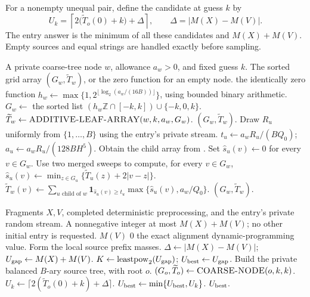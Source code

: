 \documentclass[11pt]{article}
\newenvironment{wedalgorithm}[2]{%
  \begin{algorithm}[!htbp]%
  \caption{#1}\label{#2}%
  \small\begin{algorithmic}[1]%
}{%
  \end{algorithmic}\end{algorithm}%
}
\theoremstyle{definition}
\newcommand{\1}{\mathbf 1}
\begin{document}
For a nonempty unequal pair, define the candidate at guess $k$ by
\[
 U_k=\left\lceil2\bigl(\widetilde T_o(0)+k\bigr)+\Delta\right\rceil,
 \qquad \Delta=|M(X)-M(V)|.
\]
The entry answer is the minimum of all these candidates and
$M(X)+M(V)$. Empty sources and equal strings are handled exactly before
sampling.

\begin{wedalgorithm}{Adaptive coarse-node arrays}{alg:coarse-node}
\Require A private coarse-tree node $w$, allowance $a_w>0$, and fixed guess $k$.
\Ensure The sorted grid array $(G_w,\widetilde T_w)$, or the zero function for an empty node.
   \State \Return the identically zero function \EndIf
  \State $h_w\gets\max\{1,2^{\lfloor\log_2(a_w/(16B))\rfloor}\}$, using bounded binary arithmetic.
  \State $G_w\gets$ the sorted list $(h_w\mathbb Z\cap[-k,k])\cup\{-k,0,k\}$.
    \State $\widetilde T_w\gets\Call{ADDITIVE-LEAF-ARRAY}{w,k,a_w,G_w}$.
    \State \Return $(G_w,\widetilde T_w)$.
  \EndIf
    \State Draw $R_u$ uniformly from $\{1,\ldots,B\}$ using the entry's private stream.
    \State $t_u\gets a_wR_u/(BQ_0)$; $a_u\gets a_wR_u/(128BH^5)$.
    \State Obtain the child array from .
  \EndFor
      \State Set $\widehat s_u(v)\gets0$ for every $v\in G_w$.
    \Else
      \State Use two merged sweeps to compute, for every $v\in G_w$,
      \Statex \hspace{\algorithmicindent}$\widehat s_u(v)\gets\min_{z\in G_u}\{\widetilde T_u(z)+2|v-z|\}$.
    \EndIf
  \EndFor
    \State $\widetilde T_w(v)\gets\sum_{u\text{ child of }w}\1_{\widehat s_u(v)\ge t_u}\max\{\widehat s_u(v),a_w/Q_0\}$.
  \EndFor
  \State \Return $(G_w,\widetilde T_w)$.
\EndProcedure
\end{wedalgorithm}

\begin{wedalgorithm}{A standalone initial-seed entry}{alg:initial-entry}
\Require Fragments $X,V$, completed deterministic preprocessing, and the entry's private random stream.
\Ensure A nonnegative integer at most $M(X)+M(V)$; no other initial entry is requested.
   \State \Return $M(V)$ \EndIf
    \State \Return $0$
  \EndIf
    \State \Return the exact alignment dynamic-programming value.
  \EndIf
  \State Form the local source prefix masses.
  \State $\Delta\gets|M(X)-M(V)|$; $U_{\rm gap}\gets M(X)+M(V)$.
  \State $K\gets\operatorname{leastpow}_2(U_{\rm gap})$; $U_{\rm best}\gets U_{\rm gap}$.
    \State Build the private balanced $B$-ary source tree, with root $o$.
    \State $(G_o,\widetilde T_o)\gets\Call{COARSE-NODE}{o,k,k}$.
    \State $U_k\gets\lceil2(\widetilde T_o(0)+k)+\Delta\rceil$.
    \State $U_{\rm best}\gets\min\{U_{\rm best},U_k\}$.
  \EndFor
  \State \Return $U_{\rm best}$.
\EndProcedure
\end{wedalgorithm}
\end{document}
